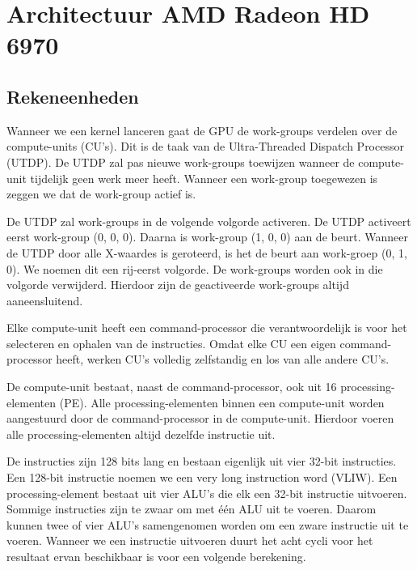 
\section{Architectuur AMD Radeon HD 6970}
\subsection{Rekeneenheden}

Wanneer we een kernel lanceren gaat de GPU de work-groups verdelen over de compute-units  (CU's). Dit is de taak van de Ultra-Threaded Dispatch Processor (UTDP). De UTDP zal pas nieuwe work-groups toewijzen wanneer de compute-unit tijdelijk geen werk meer heeft.  Wanneer een work-group toegewezen is zeggen we dat de work-group actief is. 

\label{WGvolg}
De UTDP zal work-groups in de volgende volgorde activeren. De UTDP activeert eerst work-group (0, 0, 0). Daarna is work-group (1, 0, 0) aan de beurt. Wanneer de UTDP door alle X-waardes is geroteerd, is het de beurt aan work-groep (0, 1, 0). We noemen dit een rij-eerst volgorde. De work-groups worden ook in die volgorde verwijderd. Hierdoor zijn de geactiveerde work-groups altijd aaneensluitend.\cite[p.~6-8]{amd}

Elke compute-unit heeft een command-processor die verantwoordelijk is voor het selecteren en ophalen van de instructies. Omdat elke CU een eigen command-processor heeft, werken CU's volledig zelfstandig en los van alle andere CU's.

De compute-unit bestaat, naast de command-processor, ook uit 16 processing-elementen (PE). Alle processing-elementen binnen een compute-unit worden aangestuurd door de command-processor in de compute-unit. Hierdoor voeren alle processing-elementen altijd dezelfde instructie uit.

De instructies zijn 128 bits lang en bestaan eigenlijk uit vier 32-bit instructies. Een 128-bit instructie noemen we een very long instruction word (VLIW). Een processing-element bestaat uit vier ALU's die elk een 32-bit instructie uitvoeren. Sommige instructies zijn te zwaar om met \'e\'en ALU uit te voeren. Daarom kunnen twee of vier ALU's samengenomen worden om een zware instructie uit te voeren. Wanneer we een instructie uitvoeren duurt het acht cycli voor het resultaat ervan beschikbaar is voor een volgende berekening.

